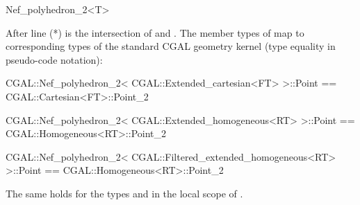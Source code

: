 \begin{ccRefClass}{Nef_polyhedron_2<T>}

After line (*)  is the intersection of  and . 
The member types of 
map to corresponding types of the standard CGAL geometry kernel
(type equality in pseudo-code notation):
\begin{ccExampleCode}
CGAL::Nef_polyhedron_2< CGAL::Extended_cartesian<FT> >::Point
  == CGAL::Cartesian<FT>::Point_2

CGAL::Nef_polyhedron_2< CGAL::Extended_homogeneous<RT> >::Point
   == CGAL::Homogeneous<RT>::Point_2

CGAL::Nef_polyhedron_2< CGAL::Filtered_extended_homogeneous<RT> >::Point
   == CGAL::Homogeneous<RT>::Point_2
\end{ccExampleCode}
The same holds for the types  and  in the
local scope of .

\end{ccRefClass}


